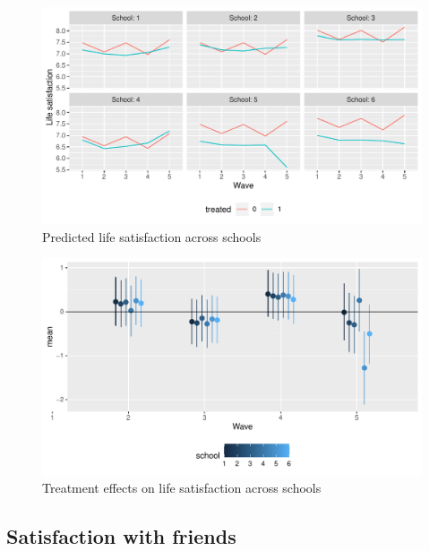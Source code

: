 \documentclass[a4, 12pt]{article}
\begin{document}
\begin{figure}[H]

{\centering \includegraphics[width=0.8\linewidth,]{../figures/lsat_pred_across_schools} 

}

\caption{Predicted life satisfaction across schools}\label{fig:lsat-pred-across-schools}
\end{figure}
\begin{figure}[H]

{\centering \includegraphics[width=0.8\linewidth,]{../figures/lsat_teff_across_schools} 

}

\caption{Treatment effects on life satisfaction across schools}\label{fig:lsat-teff-across-schools}
\end{figure}

\hypertarget{satisfaction-with-friends}{%
\subsection{Satisfaction with friends}\label{satisfaction-with-friends}}
\end{document}
